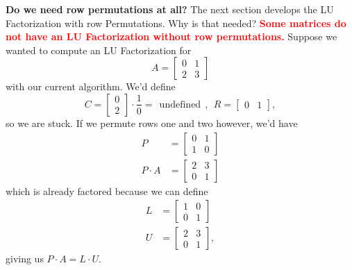 \textbf{Do we need row permutations at all?} 
The next section develops the LU Factorization with row Permutations. Why is that needed? \textcolor{red}{\bf Some matrices do not have an LU Factorization without row permutations.} Suppose we wanted to compute an LU Factorization for 
$$A = \begin{bmatrix}0 & 1\\ 2 & 3 \end{bmatrix} $$
with our current algorithm.  We'd define
$$C= \left[\begin{array}{r} 0 \\2 \end{array} \right] \cdot \frac{1}{0} =~~\text{undefined}~~ ,~~R=\left[\begin{array}{rr} 0 & 1\end{array} \right], $$
so we are stuck. If we permute rows one and two however, we'd have 
\begin{align*}
P&=  \begin{bmatrix}0 & 1\\ 1 & 0 \end{bmatrix}\\
P \cdot A &= \begin{bmatrix} 2 & 3 \\ 0 & 1\end{bmatrix}
\end{align*}
which is already factored because we can define 
\begin{align*}
L&=  \begin{bmatrix}1 & 0\\ 0 & 1 \end{bmatrix}\\
U  &= \begin{bmatrix} 2 & 3 \\ 0 & 1\end{bmatrix},
\end{align*}
giving us $P \cdot A = L \cdot U.$
\vspace*{0.5cm}

